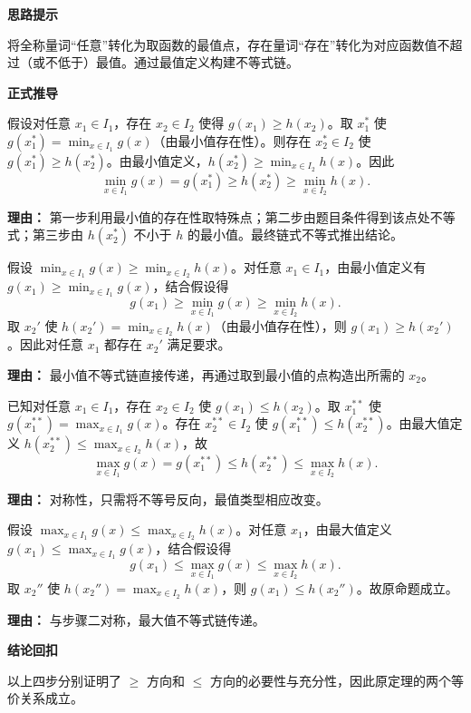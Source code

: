 \begin{proofbox}
	\textbf{\textcolor{CProof}{思路提示}}

	将全称量词“任意”转化为取函数的最值点，存在量词“存在”转化为对应函数值不超过（或不低于）最值。通过最值定义构建不等式链。

	\medskip
	\textbf{\textcolor{CProof}{正式推导}}
	\begin{description}[style=nextline, leftmargin=2.8em, labelsep=0.5em, itemsep=0.55em]
		\item[\textbf{步骤一（必要性 $\ge$）：}] 假设对任意 $x_1\in I_1$，存在 $x_2\in I_2$ 使得 $g(x_1)\ge h(x_2)$。取 $x_1^*$ 使 $g(x_1^*)=\min_{x\in I_1} g(x)$（由最小值存在性）。则存在 $x_2^*\in I_2$ 使 $g(x_1^*)\ge h(x_2^*)$。由最小值定义，$h(x_2^*)\ge \min_{x\in I_2} h(x)$。因此
			\[
				\min_{x\in I_1} g(x) = g(x_1^*) \ge h(x_2^*) \ge \min_{x\in I_2} h(x).
			\]
			\par\textbf{理由：} 第一步利用最小值的存在性取特殊点；第二步由题目条件得到该点处不等式；第三步由 $h(x_2^*)$ 不小于 $h$ 的最小值。最终链式不等式推出结论。

		\item[\textbf{步骤二（充分性 $\ge$）：}] 假设 $\min_{x\in I_1} g(x) \ge \min_{x\in I_2} h(x)$。对任意 $x_1\in I_1$，由最小值定义有 $g(x_1) \ge \min_{x\in I_1} g(x)$，结合假设得
			\[
				g(x_1) \ge \min_{x\in I_1} g(x) \ge \min_{x\in I_2} h(x).
			\]
			取 $x_2'$ 使 $h(x_2')=\min_{x\in I_2} h(x)$（由最小值存在性），则 $g(x_1) \ge h(x_2')$。因此对任意 $x_1$ 都存在 $x_2'$ 满足要求。
			\par\textbf{理由：} 最小值不等式链直接传递，再通过取到最小值的点构造出所需的 $x_2$。

		\item[\textbf{步骤三（必要性 $\le$）：}] 已知对任意 $x_1\in I_1$，存在 $x_2\in I_2$ 使 $g(x_1)\le h(x_2)$。取 $x_1^{**}$ 使 $g(x_1^{**})=\max_{x\in I_1} g(x)$。存在 $x_2^{**}\in I_2$ 使 $g(x_1^{**})\le h(x_2^{**})$。由最大值定义 $h(x_2^{**})\le \max_{x\in I_2} h(x)$，故
			\[
				\max_{x\in I_1} g(x) = g(x_1^{**}) \le h(x_2^{**}) \le \max_{x\in I_2} h(x).
			\]
			\par\textbf{理由：} 对称性，只需将不等号反向，最值类型相应改变。

		\item[\textbf{步骤四（充分性 $\le$）：}] 假设 $\max_{x\in I_1} g(x) \le \max_{x\in I_2} h(x)$。对任意 $x_1$，由最大值定义 $g(x_1) \le \max_{x\in I_1} g(x)$，结合假设得
			\[
				g(x_1) \le \max_{x\in I_1} g(x) \le \max_{x\in I_2} h(x).
			\]
			取 $x_2''$ 使 $h(x_2'')=\max_{x\in I_2} h(x)$，则 $g(x_1) \le h(x_2'')$。故原命题成立。
			\par\textbf{理由：} 与步骤二对称，最大值不等式链传递。
	\end{description}

	\medskip
	\textbf{\textcolor{CProof}{结论回扣}}

	以上四步分别证明了 $\ge$ 方向和 $\le$ 方向的必要性与充分性，因此原定理的两个等价关系成立。
\end{proofbox}
